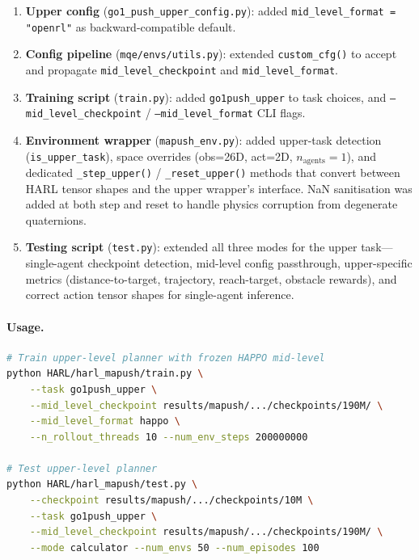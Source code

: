 \begin{dirtree}
\begin{enumerate}
  \item \textbf{Upper config} (\texttt{go1\_push\_upper\_config.py}): added
        \texttt{mid\_level\_format = "openrl"} as backward-compatible default.

  \item \textbf{Config pipeline} (\texttt{mqe/envs/utils.py}): extended
        \texttt{custom\_cfg()} to accept and propagate
        \texttt{mid\_level\_checkpoint} and \texttt{mid\_level\_format}.

  \item \textbf{Training script} (\texttt{train.py}): added
        \texttt{go1push\_upper} to task choices, and
        \texttt{--mid\_level\_checkpoint} / \texttt{--mid\_level\_format}
        CLI flags.

  \item \textbf{Environment wrapper} (\texttt{mapush\_env.py}): added upper-task
        detection (\texttt{is\_upper\_task}), space overrides
        (obs=26D, act=2D, $n_\text{agents}=1$), and dedicated
        \texttt{\_step\_upper()} / \texttt{\_reset\_upper()} methods that
        convert between HARL tensor shapes and the upper wrapper's interface.
        NaN sanitisation was added at both step and reset to handle physics
        corruption from degenerate quaternions.

  \item \textbf{Testing script} (\texttt{test.py}): extended all three modes
        for the upper task---single-agent checkpoint detection, mid-level
        config passthrough, upper-specific metrics (distance-to-target,
        trajectory, reach-target, obstacle rewards), and correct action
        tensor shapes for single-agent inference.
\end{enumerate}

\paragraph{Usage.}

\begin{lstlisting}[style=bashstyle, language=bash]
# Train upper-level planner with frozen HAPPO mid-level
python HARL/harl_mapush/train.py \
    --task go1push_upper \
    --mid_level_checkpoint results/mapush/.../checkpoints/190M/ \
    --mid_level_format happo \
    --n_rollout_threads 10 --num_env_steps 200000000

# Test upper-level planner
python HARL/harl_mapush/test.py \
    --checkpoint results/mapush/.../checkpoints/10M \
    --task go1push_upper \
    --mid_level_checkpoint results/mapush/.../checkpoints/190M/ \
    --mode calculator --num_envs 50 --num_episodes 100
\end{lstlisting}


\end{dirtree}
